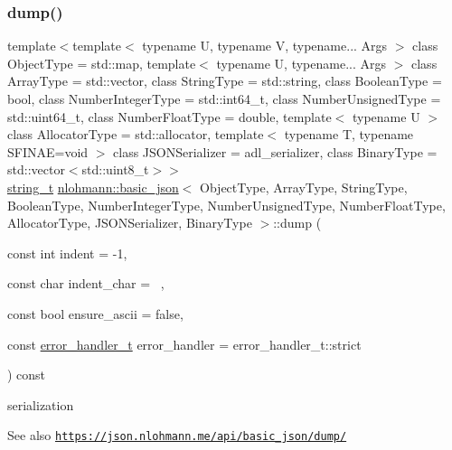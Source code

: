 \subsubsection{\texorpdfstring{dump()}{dump()}}
{\footnotesize\ttfamily template$<$template$<$ typename U, typename V, typename... Args $>$ class Object\+Type = std\+::map, template$<$ typename U, typename... Args $>$ class Array\+Type = std\+::vector, class String\+Type  = std\+::string, class Boolean\+Type  = bool, class Number\+Integer\+Type  = std\+::int64\+\_\+t, class Number\+Unsigned\+Type  = std\+::uint64\+\_\+t, class Number\+Float\+Type  = double, template$<$ typename U $>$ class Allocator\+Type = std\+::allocator, template$<$ typename T, typename S\+F\+I\+N\+A\+E=void $>$ class J\+S\+O\+N\+Serializer = adl\+\_\+serializer, class Binary\+Type  = std\+::vector$<$std\+::uint8\+\_\+t$>$$>$ \\
\hyperlink{classnlohmann_1_1basic__json_a33593865ffb1860323dcbd52425b90c8}{string\+\_\+t} \hyperlink{classnlohmann_1_1basic__json}{nlohmann\+::basic\+\_\+json}$<$ Object\+Type, Array\+Type, String\+Type, Boolean\+Type, Number\+Integer\+Type, Number\+Unsigned\+Type, Number\+Float\+Type, Allocator\+Type, J\+S\+O\+N\+Serializer, Binary\+Type $>$\+::dump (\begin{DoxyParamCaption}\item[{const int}]{indent = {\ttfamily -\/1},  }\item[{const char}]{indent\+\_\+char = {\ttfamily \textquotesingle{}~\textquotesingle{}},  }\item[{const bool}]{ensure\+\_\+ascii = {\ttfamily false},  }\item[{const \hyperlink{namespacenlohmann_1_1detail_a5a76b60b26dc8c47256a996d18d967df}{error\+\_\+handler\+\_\+t}}]{error\+\_\+handler = {\ttfamily error\+\_\+handler\+\_\+t\+:\+:strict} }\end{DoxyParamCaption}) const\hspace{0.3cm}{\ttfamily [inline]}}



serialization 

\begin{DoxySeeAlso}{See also}
\href{https://json.nlohmann.me/api/basic_json/dump/}{\tt https\+://json.\+nlohmann.\+me/api/basic\+\_\+json/dump/} 
\end{DoxySeeAlso}
\mbox{\label{classnlohmann_1_1basic__json_ac479e609cbd03948bd3e85fb441b66e5}} 
